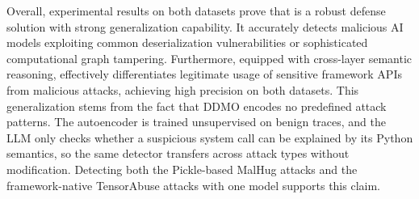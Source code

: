 %
%

Overall, experimental results on both datasets prove that \toolname{} is a robust defense solution with strong generalization capability. It accurately detects malicious AI models exploiting common deserialization vulnerabilities or sophisticated computational graph tampering. Furthermore, equipped with cross-layer semantic reasoning, \toolname{} effectively differentiates legitimate usage of sensitive framework APIs from malicious attacks, achieving high precision on both datasets. This generalization stems from the fact that DDMO encodes no predefined attack patterns. The autoencoder is trained unsupervised on benign traces, and the LLM only checks whether a suspicious system call can be explained by its Python semantics, so the same detector transfers across attack types without modification. Detecting both the Pickle-based MalHug attacks and the framework-native TensorAbuse attacks with one model supports this claim.

\label{sec:rq2}
